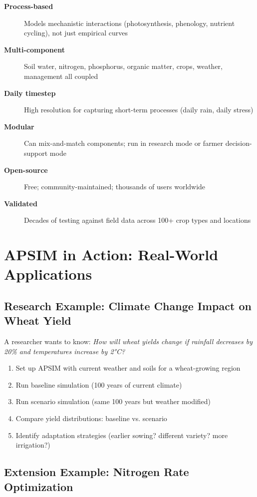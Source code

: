 \begin{description}
  \item[\textbf{Process-based}] Models mechanistic interactions (photosynthesis, phenology, nutrient cycling), not just empirical curves
  \item[\textbf{Multi-component}] Soil water, nitrogen, phosphorus, organic matter, crops, weather, management all coupled
  \item[\textbf{Daily timestep}] High resolution for capturing short-term processes (daily rain, daily stress)
  \item[\textbf{Modular}] Can mix-and-match components; run in research mode or farmer decision-support mode
  \item[\textbf{Open-source}] Free; community-maintained; thousands of users worldwide
  \item[\textbf{Validated}] Decades of testing against field data across 100+ crop types and locations
\end{description}

\section{APSIM in Action: Real-World Applications}

\subsection{Research Example: Climate Change Impact on Wheat Yield}

A researcher wants to know: \textit{How will wheat yields change if rainfall decreases by 20\% and temperatures increase by 2°C?}

\begin{enumerate}
  \item Set up APSIM with current weather and soils for a wheat-growing region
  \item Run baseline simulation (100 years of current climate)
  \item Run scenario simulation (same 100 years but weather modified)
  \item Compare yield distributions: baseline vs. scenario
  \item Identify adaptation strategies (earlier sowing? different variety? more irrigation?)
\end{enumerate}

\subsection{Extension Example: Nitrogen Rate Optimization}

